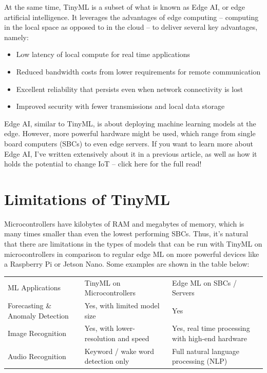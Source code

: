 At the same time, TinyML is a subset of what is known as Edge AI, or edge artificial intelligence. It leverages the advantages of edge computing – computing in the local space as opposed to in the cloud – to deliver several key advantages, namely:

\begin{itemize}
  \item Low latency of local compute for real time applications
  \item Reduced bandwidth costs from lower requirements for remote communication
  \item Excellent reliability that persists even when network connectivity is lost
  \item Improved security with fewer transmissions and local data storage
\end{itemize}

Edge AI, similar to TinyML, is about deploying machine learning models at the edge. However, more powerful hardware might be used, which range from single board computers (SBCs) to even edge servers. If you want to learn more about Edge AI, I’ve written extensively about it in a previous article, as well as how it holds the potential to change IoT – click here for the full read!

\section{Limitations of TinyML}

Microcontrollers have kilobytes of RAM and megabytes of memory, which is many times smaller than even the lowest performing SBCs. Thus, it’s natural that there are limitations in the types of models that can be run with TinyML on microcontrollers in comparison to regular edge ML on more powerful devices like a Raspberry Pi or Jetson Nano. Some examples are shown in the table below:

\begin{tabular}{L{30mm}L{30mm}L{30mm}}
    ML Applications&	TinyML on Microcontrollers&	Edge ML on SBCs / Servers\\
Forecasting \& Anomaly Detection &	Yes, with limited model size&	Yes\\
Image Recognition &	Yes, with lower-resolution and speed&	Yes, real time processing with high-end hardware\\
Audio Recognition &	Keyword / wake word detection only &	Full natural language processing (NLP) \\
\end{tabular}

